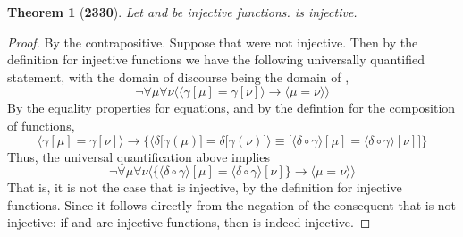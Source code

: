 \documentclass[preview]{standalone}
\newtheorem*{theorem*}{Theorem}
\begin{document}
\begin{theorem*}[\textbf{2330}]
    Let \bm{$\delta$} and 
    \bm{$\big \langle \delta \circ \gamma \big \rangle$} 
    be injective functions.
    \bm{$\gamma$} is injective.
\end{theorem*}

\begin{proof}
    By the contrapositive. Suppose that \bm{$\gamma$} were not injective. 
    Then by the definition for injective functions we have the following universally quantified statement, 
    with the domain of discourse being the domain of \bm{$\gamma$},
    \begin{equation*}
        \lnot \forall \mu \forall \nu \Big \langle
            \big \langle \gamma [\mu] = \gamma [\nu] \big \rangle
                \rightarrow 
            \big \langle \mu = \nu \big \rangle
        \Big \rangle
    \end{equation*}
    By the equality properties for equations, and by the defintion for the composition of functions,
    \begin{equation*}
        \Big \langle
            \gamma[\mu] = \gamma[\nu] 
        \Big \rangle
            \rightarrow 
        \bigg\{
            \Big \langle
                \delta \big[ \gamma(\mu) \big] 
                    = 
                \delta \big[ \gamma(\nu) \big] 
            \Big \rangle
                \equiv 
            \Big[
                \big \langle \delta \circ \gamma \big \rangle [\mu] 
                    = 
                \big \langle \delta \circ \gamma \big \rangle [\nu]
            \Big]
        \bigg\}
    \end{equation*}
    Thus, the universal quantification above implies
    \begin{equation*}
        \lnot \forall \mu \forall \nu \bigg \langle
            \Big\{
                \big \langle \delta \circ \gamma \big \rangle [\mu] 
                    = 
                \big \langle \delta \circ \gamma \big \rangle [\nu]
            \Big\}
                \rightarrow
            \big \langle \mu = \nu \big \rangle
        \bigg \rangle
    \end{equation*}
    That is, 
    it is not the case that 
    \bm{$\big \langle \delta \circ \gamma \big \rangle$} is injective, by the definition for injective functions. 
    Since it follows directly from the negation of the consequent that 
    \bm{$\big \langle \delta \circ \gamma \big \rangle$} is not injective:
    if \bm{$\delta$} and 
    \bm{$\big \langle \delta \circ \gamma \big \rangle$} 
    are injective functions, 
    then \bm{$\gamma$} is indeed injective.
\color{lightgray} \end{proof}
\end{document}
